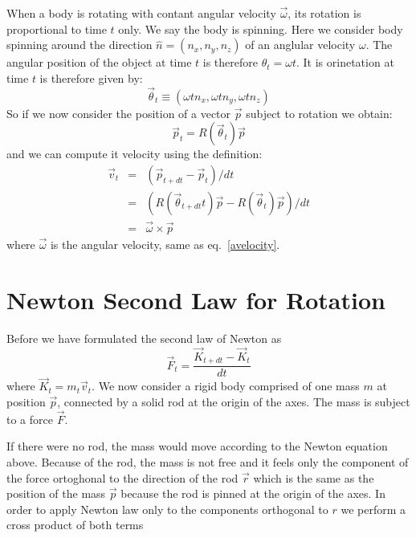 \documentclass[12pt]{article}
\begin{document}
When a body is rotating with contant angular velocity $\vec \omega$, its rotation is proportional to time $t$ only. We say the body is spinning. Here we consider body spinning around the direction $\hat n=(n_x,n_y,n_z)$ of an anglular velocity $\omega$. The angular position of the object at time $t$ is therefore $\theta_t = \omega t$.
It is orinetation at time $t$ is therefore given by:
\begin{equation}
\vec \theta_t \equiv (\omega t n_x, \omega t n_y, \omega t n_z)
\end{equation}
So if we now consider the position of a vector $\vec p$ subject to rotation we obtain:
\begin{equation}
\vec p_t = R(\vec \theta_t) \vec p
\label{rottheta}
\end{equation}
and we can compute it velocity using the definition:
\begin{eqnarray}
\vec v_t &=& (\vec p_{t+dt} - \vec p_t)/dt \\
         &=& (R(\vec \theta_{t+dt}t) \vec p - R(\vec \theta_t) \vec p)/dt \\
         &=& \vec \omega \times \vec p
\label{vomega}
\end{eqnarray}
where $\vec \omega$ is the angular velocity, same as eq.~\ref{avelocity}.

\section{Newton Second Law for Rotation}

Before we have formulated the second law of Newton as
\begin{equation}
\vec F_t = \frac{\vec K_{t+dt}-\vec K_t}{dt}
\end{equation}
where $\vec K_t = m_t \vec v_t$.
We now consider a rigid body comprised of one mass $m$ at position $\vec p$, connected by a solid rod at the origin of the axes. The mass is subject to a force $\vec F$.

If there were no rod, the mass would move according to the Newton equation above. Because of the rod, the mass is not free and it feels only the component of the force ortoghonal to the direction of the rod $\vec r$ which is the same as the position of the mass $\vec p$ because the rod is pinned at the origin of the axes. In order to apply Newton law only to the components orthogonal to $r$ we perform a cross product of both terms
\end{document}
